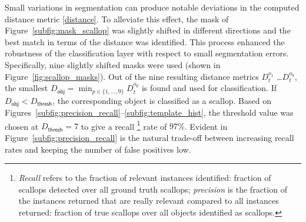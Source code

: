 \documentclass {udthesis}
\begin{document}
Small variations in segmentation can produce notable deviations in the computed distance metric \eqref{distance}.
To alleviate this effect, the mask of Figure~\ref{subfig:mask_scallop} was slightly shifted in different directions and the best match in terms of the distance was identified.
This process enhanced the robustness of the classification layer with respect to  small segmentation errors.
Specifically, nine slightly shifted masks were used (shown in
Figure~\ref{fig:scallop_masks}).  Out of the nine resulting
distance metrics $D^{o_1}_t$ \ldots $D^{o_9}_t$, the smallest $
 D_\mathsf{obj}=\min_{p\in\{1,\ldots,9\}} D^{o_p}_t
$ is found and used for classification. 
If $D_\mathsf{obj}<D_\mathsf{thresh}$, 
the corresponding object
is classified as a scallop.
Based on Figures~\ref{subfig:precision_recall}--\ref{subfig:template_hist},
the threshold value was chosen at $D_\mathsf{thresh}=7$ to give a recall \footnote{\emph{Recall} refers to the fraction of relevant instances
identified: fraction of scallops detected over all ground truth scallops;
\emph{precision} is the fraction of the instances returned that are really relevant
compared to all instances returned: fraction of true scallops over all objects
identified as scallops.} rate of 
$97\%$.
Evident in Figure~\ref{subfig:precision_recall} is the natural trade-off between increasing recall rates and keeping the number of false positives low.
\end{document}
